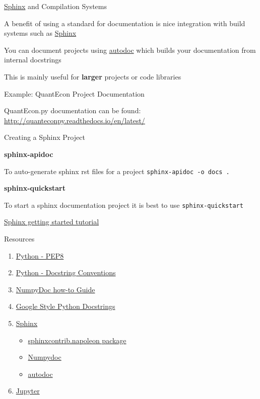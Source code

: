 \documentclass{beamer}
\begin{document}
\begin{frame}{\href{http://www.sphinx-doc.org/en/stable/}{Sphinx} and Compilation Systems}

A benefit of using a standard for documentation is nice integration with build systems such as \href{http://www.sphinx-doc.org/en/stable/}{Sphinx}

You can document projects using \href{http://www.sphinx-doc.org/en/stable/ext/autodoc.html}{autodoc} which builds your documentation from internal docstrings

This is mainly useful for \textbf{larger} projects or code libraries

\end{frame}

\begin{frame}{Example: QuantEcon Project Documentation}

QuantEcon.py documentation can be found: \url{http://quanteconpy.readthedocs.io/en/latest/}

\end{frame}

\begin{frame}[fragile]{Creating a Sphinx Project}

\textbf{sphinx-apidoc}

To auto-generate sphinx rst files for a project \texttt{sphinx-apidoc -o docs .} 

\textbf{sphinx-quickstart}

To start a sphinx documentation project it is best to use \texttt{sphinx-quickstart}

\href{http://www.sphinx-doc.org/en/stable/tutorial.html}{Sphinx getting started tutorial}

\end{frame}

\begin{frame}{Resources}
\begin{enumerate}
\item \href{https://www.python.org/dev/peps/pep-0008/}{Python - PEP8}
\item \href{https://www.python.org/dev/peps/pep-0257/}{Python - Docstring Conventions}
\item \href{https://github.com/numpy/numpy/blob/master/doc/HOWTO_DOCUMENT.rst.txt}{NumpyDoc how-to Guide}
\item \href{http://sphinxcontrib-napoleon.readthedocs.io/en/latest/example_google.html}{Google Style Python Docstrings}
\item \href{http://www.sphinx-doc.org/en/stable/}{Sphinx}
\begin{itemize}
  \item \href{http://sphinxcontrib-napoleon.readthedocs.io/en/latest/sphinxcontrib.napoleon.html}{sphinxcontrib.napoleon package}
  \item \href{https://github.com/numpy/numpydoc}{Numpydoc}
  \item \href{http://www.sphinx-doc.org/en/stable/ext/autodoc.html}{autodoc}
\end{itemize}
\item \href{http://jupyter.org/}{Jupyter}
\end{enumerate}
\end{frame}
\end{document}
